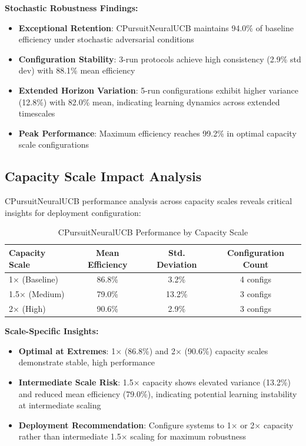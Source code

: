 \documentclass[12pt,a4paper]{article}
\newcommand{\primarytext}[1]{\textcolor{primaryblue}{\textbf{#1}}}
\newcommand{\secondarytext}[1]{\textcolor{secondaryblue}{\textbf{#1}}}
\newcommand{\success}[1]{\textcolor{accentgreen}{\textbf{#1}}}
\newcommand{\warning}[1]{\textcolor{warningred}{\textbf{#1}}}
\begin{document}
\textbf{Stochastic Robustness Findings:}
\begin{itemize}
\item \success{Exceptional Retention}: CPursuitNeuralUCB maintains 94.0\% of baseline efficiency under stochastic adversarial conditions
\item \primarytext{Configuration Stability}: 3-run protocols achieve high consistency (2.9\% std dev) with 88.1\% mean efficiency
\item \secondarytext{Extended Horizon Variation}: 5-run configurations exhibit higher variance (12.8\%) with 82.0\% mean, indicating learning dynamics across extended timescales
\item \success{Peak Performance}: Maximum efficiency reaches 99.2\% in optimal capacity scale configurations
\end{itemize}

\subsection{Capacity Scale Impact Analysis}

CPursuitNeuralUCB performance analysis across capacity scales reveals critical insights for deployment configuration:

\begin{table}[H]
\centering
\caption{CPursuitNeuralUCB Performance by Capacity Scale}
\begin{tabular}{@{}lccc@{}}
\toprule
\textbf{Capacity Scale} & \textbf{Mean Efficiency} & \textbf{Std. Deviation} & \textbf{Configuration Count} \\
\midrule
1× (Baseline) & 86.8\% & 3.2\% & 4 configs \\
1.5× (Medium) & 79.0\% & 13.2\% & 3 configs \\
2× (High) & 90.6\% & 2.9\% & 3 configs \\
\bottomrule
\end{tabular}
\end{table}

\textbf{Scale-Specific Insights:}
\begin{itemize}
\item \success{Optimal at Extremes}: 1× (86.8\%) and 2× (90.6\%) capacity scales demonstrate stable, high performance
\item \warning{Intermediate Scale Risk}: 1.5× capacity shows elevated variance (13.2\%) and reduced mean efficiency (79.0\%), indicating potential learning instability at intermediate scaling
\item \primarytext{Deployment Recommendation}: Configure systems to 1× or 2× capacity rather than intermediate 1.5× scaling for maximum robustness
\end{itemize}
\end{document}
